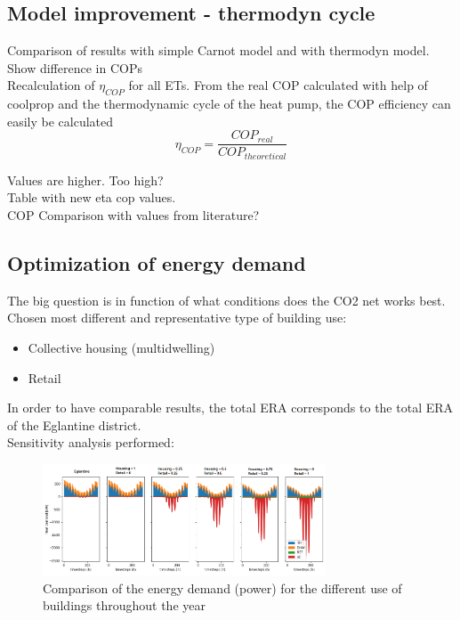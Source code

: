 \documentclass{article}
\begin{document}
\subsection{Model improvement - thermodyn cycle}

Comparison of results with simple Carnot model and with thermodyn model. Show difference in COPs\\

Recalculation of $\eta_{COP}$ for all ETs. From the real COP calculated with help of coolprop and the thermodynamic cycle of the heat pump, the COP efficiency can easily be calculated
\begin{equation}
	\eta_{COP} = \frac{COP_{real}}{COP_{theoretical}}
\end{equation}

Values are higher. Too high?\\

Table with new eta cop values.\\

COP Comparison with values from literature?\\


\subsection{Optimization of energy demand}

The big question is in function of what conditions does the CO2 net works best.
Chosen most different and representative type of building use:
\begin{itemize}
	\item Collective housing (multidwelling)
	\item Retail
\end{itemize}
In order to have comparable results, the total ERA corresponds to the total ERA of the Eglantine district.\\

Sensitivity analysis performed:

\begin{figure}[htp]
	\centering
	\includegraphics[width=0.75\textwidth]{CU_Edemand.png}
	\caption{Comparison of the energy demand (power) for the different use of buildings throughout the year}
	\label{fig:CU_E}
\end{figure}
\end{document}
